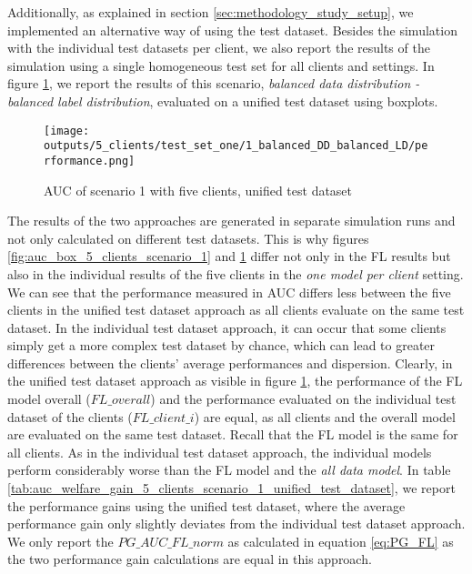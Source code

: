 Additionally, as explained in section \ref{sec:methodology_study_setup}, we implemented an alternative way of using the test dataset. Besides the simulation with the individual test datasets per client, we also report the results of the simulation using a single homogeneous test set for all clients and settings. In figure \ref{fig:auc_box_5_clients_scenario_1_uni}, we report the results of this scenario, \emph{balanced data distribution - balanced label distribution}, evaluated on a unified test dataset using boxplots.
\begin{figure}[htb!]
    \centering
    \texttt{[image: outputs/5\_clients/test\_set\_one/1\_balanced\_DD\_balanced\_LD/performance.png]}
    \caption{AUC of scenario 1 with five clients, unified test dataset}
    \label{fig:auc_box_5_clients_scenario_1_uni}
\end{figure}
The results of the two approaches are generated in separate simulation runs and not only calculated on different test datasets. This is why figures \ref{fig:auc_box_5_clients_scenario_1} and \ref{fig:auc_box_5_clients_scenario_1_uni} differ not only in the FL results but also in the individual results of the five clients in the \emph{one model per client} setting. We can see that the performance measured in AUC differs less between the five clients in the unified test dataset approach as all clients evaluate on the same test dataset. In the individual test dataset approach, it can occur that some clients simply get a more complex test dataset by chance, which can lead to greater differences between the clients' average performances and dispersion. Clearly, in the unified test dataset approach as visible in figure \ref{fig:auc_box_5_clients_scenario_1_uni}, the performance of the FL model overall ($FL\_overall$) and the performance evaluated on the individual test dataset of the clients ($FL\_client\_i$) are equal, as all clients and the overall model are evaluated on the same test dataset. Recall that the FL model is the same for all clients. As in the individual test dataset approach, the individual models perform considerably worse than the FL model and the \emph{all data model}.
In table \ref{tab:auc_welfare_gain_5_clients_scenario_1_unified_test_dataset}, we report the performance gains using the unified test dataset, where the average performance gain only slightly deviates from the individual test dataset approach.
 We only report the $PG\_AUC\_FL\_norm$ as calculated in equation \ref{eq:PG_FL} as the two performance gain calculations are equal in this approach.

